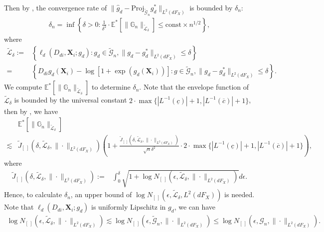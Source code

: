 \documentclass[11pt]{article}
\def\bs{\boldsymbol}
\numberwithin{equation}{section}
\begin{document}
Then by  \citet[Theorems 3.4.1]{van1996weak}, the convergence rate of  $\|\widehat{g}_d-\text{Proj}_{\widetilde{\mathcal{G}}_n}g_d^*\|_{L^2(dF_X)}$ is bounded by $\delta_n$:
\begin{align}\label{def:delta_n}
	\delta_n=\inf \left\{ \delta>0:\frac{1}{\delta^{2}}\cdot \mathbb{E}^*\left[\|\mathbb{G}_n\|_{\widetilde{\mathcal{L}}_{\delta}}\right]\leq \text{const}\times n^{1/2} \right\},
\end{align}
where
\begin{align*}
	\widetilde{\mathcal{L}}_{\delta}:=&\left\{\ell_d(D_{di},\boldsymbol{X}_i;g_d):g_d\in\widetilde{\mathcal{G}}_n,\|g_d-g_d^*\|_{L^2(dF_X)}\leq \delta \right\}\\
	=&\left\{D_{di}g_d(\boldsymbol{X}_i)-\log\left[1+\exp(g_d(\bs{X}_i))\right]:g\in\widetilde{\mathcal{G}}_n,\|g_d-g_d^*\|_{L^2(dF_X)}\leq \delta \right\}.
\end{align*}	
We compute $\mathbb{E}^*\left[\|\mathbb{G}_n\|_{\widetilde{\mathcal{L}}_{\delta}}\right]$ to determine $\delta_n$. Note that the envelope function of $\widetilde{\mathcal{L}}_{\delta}$ is bounded by the universal constant $2\cdot \max\{|L^{-1}(\underline{c})|+1,|L^{-1}(\overline{c})|+1\}$, then by \citet[Lemma 3.4.2]{van1996weak}, we have
\begin{align*}
	&\mathbb{E}^*\left[\|\mathbb{G}_n\|_{\widetilde{\mathcal{L}}_{\delta}}\right]\\
	\lesssim& \widetilde{J}_{[\ ]}(\delta,\widetilde{\mathcal{L}}_{\delta},\|\cdot\|_{L^2(dF_{X})})\left(1+\frac{\widetilde{J}_{[\ ]}(\delta,\widetilde{\mathcal{L}}_{\delta},\|\cdot\|_{L^2(dF_{X})})}{\sqrt{n}\delta^2}\cdot 2\cdot \max\{|L^{-1}(\underline{c})|+1,|L^{-1}(\overline{c})|+1\}\right),
\end{align*}
where
\begin{align*}
	\widetilde{J}_{[\ ]}(\delta,\widetilde{\mathcal{L}}_{\delta},\|\cdot\|_{L^2(dF_{X})}):=&\int_0^{\delta}\sqrt{1+\log N_{[\ ]}(\epsilon,\widetilde{\mathcal{L}}_{\delta},\|\cdot\|_{L^2(dF_{X})})}d\epsilon.
\end{align*}
Hence, to calculate $\delta_n$, an upper bound of $\log N_{[\ ]}(\epsilon,\widetilde{\mathcal{L}}_{\delta},L^2(dF_X))$ is needed. Note that $\ell_d(D_{di},\boldsymbol{X}_i;g_d)$ is uniformly Lipschitz in $g_d$,  we can have
\begin{align*}
	\log N_{[\ ]}(\epsilon,\widetilde{\mathcal{L}}_{\delta},\|\cdot\|_{L^2(dF_{X})}) \lesssim 	\log N_{[\ ]}(\epsilon,\widetilde{\mathcal{G}}_{n},\|\cdot\|_{L^2(dF_{X})}) \leq 	\log N_{[\ ]}(\epsilon,\mathcal{G}_{n},\|\cdot\|_{L^2(dF_{X})}).
\end{align*}
\end{document}
